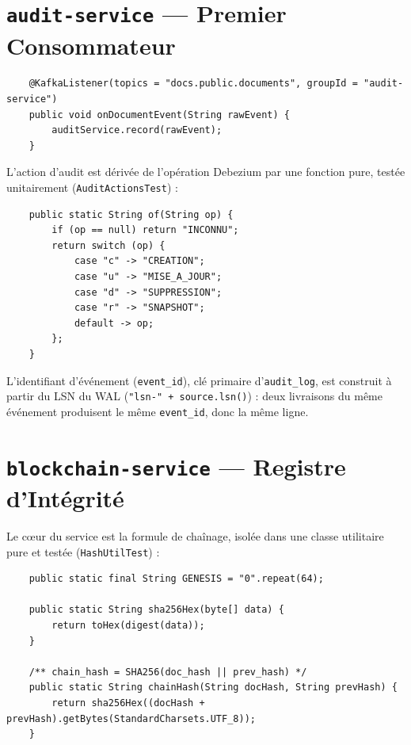 \documentclass[12pt,a4paper,openany]{report}
\begin{document}
    \section{\texttt{audit-service} --- Premier Consommateur}

    \begin{lstlisting}
    @KafkaListener(topics = "docs.public.documents", groupId = "audit-service")
    public void onDocumentEvent(String rawEvent) {
        auditService.record(rawEvent);
    }
    \end{lstlisting}

    L'action d'audit est d\'eriv\'ee de l'op\'eration Debezium par une fonction pure, test\'ee unitairement (\texttt{AuditActionsTest}) :

    \begin{lstlisting}
    public static String of(String op) {
        if (op == null) return "INCONNU";
        return switch (op) {
            case "c" -> "CREATION";
            case "u" -> "MISE_A_JOUR";
            case "d" -> "SUPPRESSION";
            case "r" -> "SNAPSHOT";
            default -> op;
        };
    }
    \end{lstlisting}

    L'identifiant d'\'ev\'enement (\texttt{event\_id}), cl\'e primaire d'\texttt{audit\_log}, est construit \`a partir du LSN du WAL (\texttt{"lsn-" + source.lsn()}) : deux livraisons du m\^eme \'ev\'enement produisent le m\^eme \texttt{event\_id}, donc la m\^eme ligne.

    \section{\texttt{blockchain-service} --- Registre d'Int\'egrit\'e}

    Le c\oe ur du service est la formule de cha\^inage, isol\'ee dans une classe utilitaire pure et test\'ee (\texttt{HashUtilTest}) :

    \begin{lstlisting}
    public static final String GENESIS = "0".repeat(64);

    public static String sha256Hex(byte[] data) {
        return toHex(digest(data));
    }

    /** chain_hash = SHA256(doc_hash || prev_hash) */
    public static String chainHash(String docHash, String prevHash) {
        return sha256Hex((docHash + prevHash).getBytes(StandardCharsets.UTF_8));
    }
    \end{lstlisting}
\end{document}
